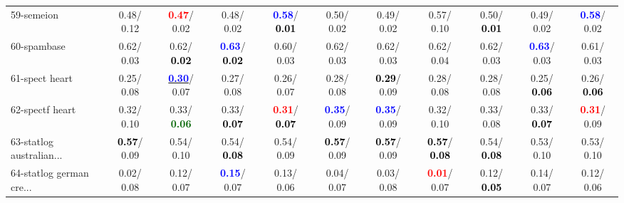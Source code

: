 \begin{table}[h]
\begin{center}
{\begin{tabular}{lc|c|c|c|c|c|c|c|c|c}
59-semeion &   0.48/  0.12 & \textcolor{red}{\textbf{  0.47}}/  0.02 &   0.48/  0.02 & \textcolor{blue}{\textbf{  0.58}}/\textcolor{black}{\textbf{  0.01}} &   0.50/  0.02 &   0.49/  0.02 &   0.57/  0.10 &   0.50/\textcolor{black}{\textbf{  0.01}} &   0.49/  0.02 & \textcolor{blue}{\textbf{  0.58}}/  0.02 \\
60-spambase &   0.62/  0.03 &   0.62/\textcolor{black}{\textbf{  0.02}} & \textcolor{blue}{\textbf{  0.63}}/\textcolor{black}{\textbf{  0.02}} &   0.60/  0.03 &   0.62/  0.03 &   0.62/  0.03 &   0.62/  0.04 &   0.62/  0.03 & \textcolor{blue}{\textbf{  0.63}}/  0.03 &   0.61/  0.03 \\ \hline
61-spect heart &   0.25/  0.08 & \underline{\textcolor{blue}{\textbf{  0.30}}}/  0.07 &   0.27/  0.08 &   0.26/  0.07 &   0.28/  0.08 & \textcolor{black}{\textbf{  0.29}}/  0.09 &   0.28/  0.08 &   0.28/  0.08 &   0.25/\textcolor{black}{\textbf{  0.06}} &   0.26/\textcolor{black}{\textbf{  0.06}} \\
62-spectf heart &   0.32/  0.10 &   0.33/\textcolor{darkgreen}{\textbf{  0.06}} &   0.33/\textcolor{black}{\textbf{  0.07}} & \textcolor{red}{\textbf{  0.31}}/\textcolor{black}{\textbf{  0.07}} & \textcolor{blue}{\textbf{  0.35}}/  0.09 & \textcolor{blue}{\textbf{  0.35}}/  0.09 &   0.32/  0.10 &   0.33/  0.08 &   0.33/\textcolor{black}{\textbf{  0.07}} & \textcolor{red}{\textbf{  0.31}}/  0.09 \\
63-statlog australian... & \textcolor{black}{\textbf{  0.57}}/  0.09 &   0.54/  0.10 &   0.54/\textcolor{black}{\textbf{  0.08}} &   0.54/  0.09 & \textcolor{black}{\textbf{  0.57}}/  0.09 & \textcolor{black}{\textbf{  0.57}}/  0.09 & \textcolor{black}{\textbf{  0.57}}/\textcolor{black}{\textbf{  0.08}} &   0.54/\textcolor{black}{\textbf{  0.08}} &   0.53/  0.10 &   0.53/  0.10 \\
64-statlog german cre... &   0.02/  0.08 &   0.12/  0.07 & \textcolor{blue}{\textbf{  0.15}}/  0.07 &   0.13/  0.06 &   0.04/  0.07 &   0.03/  0.08 & \textcolor{red}{\textbf{  0.01}}/  0.07 &   0.12/\textcolor{black}{\textbf{  0.05}} &   0.14/  0.07 &   0.12/  0.06 \\\end{tabular}}\label{stratsALCKappa1bestb}
\end{center}
\end{table}
